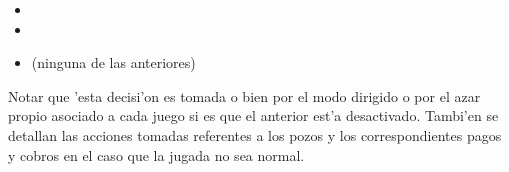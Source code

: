 \begin{itemize}
  \item {}
  \item {} 
  \item {} (ninguna de las anteriores)
\end{itemize}

Notar que 'esta decisi'on es tomada o bien por el modo dirigido o por el azar propio asociado a cada juego si es que el anterior est'a desactivado. Tambi'en se detallan las acciones tomadas referentes a los pozos y los correspondientes pagos y cobros en el caso que la jugada no sea normal.





